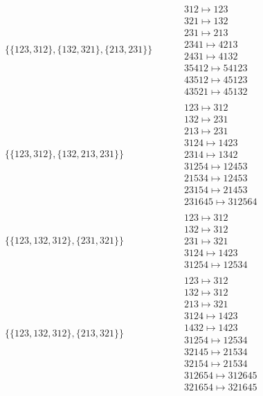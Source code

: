 \begin{tiny}
\begin{align}
\begin{matrix}
\end{matrix}
\\
\{\{123, 312\}, \{132, 321\}, \{213, 231\}\}
\quad
&
\phantom{.}
&
\begin{matrix}
312 \mapsto 123\\321 \mapsto 132\\231 \mapsto 213\\2341 \mapsto 4213\\2431 \mapsto 4132\\35412 \mapsto 54123\\43512 \mapsto 45123\\43521 \mapsto 45132
\end{matrix}
\\
\{\{123, 312\}, \{132, 213, 231\}\}
\quad
&
\phantom{.}
&
\begin{matrix}
123 \mapsto 312\\132 \mapsto 231\\213 \mapsto 231\\3124 \mapsto 1423\\2314 \mapsto 1342\\31254 \mapsto 12453\\21534 \mapsto 12453\\23154 \mapsto 21453\\231645 \mapsto 312564
\end{matrix}
\\
\{\{123, 132, 312\}, \{231, 321\}\}
\quad
&
\phantom{.}
&
\begin{matrix}
123 \mapsto 312\\132 \mapsto 312\\231 \mapsto 321\\3124 \mapsto 1423\\31254 \mapsto 12534
\end{matrix}
\\
\{\{123, 132, 312\}, \{213, 321\}\}
\quad
&
\phantom{.}
&
\begin{matrix}
123 \mapsto 312\\132 \mapsto 312\\213 \mapsto 321\\3124 \mapsto 1423\\1432 \mapsto 1423\\31254 \mapsto 12534\\32145 \mapsto 21534\\32154 \mapsto 21534\\312654 \mapsto 312645\\321654 \mapsto 321645
\end{matrix}

\end{align}
\end{tiny}
